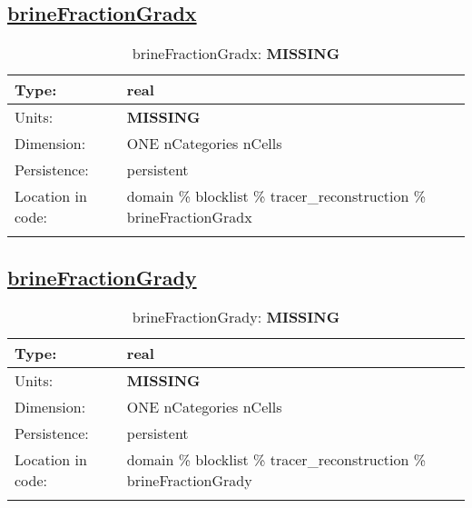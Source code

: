 \subsection[brineFractionGradx]{\hyperref[sec:var_tab_tracer_reconstruction]{brineFractionGradx}}
\label{subsec:var_sec_tracer_reconstruction_brineFractionGradx}
\begin{center}
\begin{longtable}{| p{2.0in} | p{4.0in} |}
        \hline 
        Type: & real \\
        \hline 
        Units: & {\bf \color{red} MISSING} \\
        \hline 
        Dimension: & ONE nCategories nCells \\
        \hline 
        Persistence: & persistent \\
        \hline 
         Location in code: & domain \% blocklist \% tracer\_reconstruction \% brineFractionGradx \\
         \hline 
    \caption{brineFractionGradx: {\bf \color{red} MISSING}}
\end{longtable}
\end{center}
\subsection[brineFractionGrady]{\hyperref[sec:var_tab_tracer_reconstruction]{brineFractionGrady}}
\label{subsec:var_sec_tracer_reconstruction_brineFractionGrady}
\begin{center}
\begin{longtable}{| p{2.0in} | p{4.0in} |}
        \hline 
        Type: & real \\
        \hline 
        Units: & {\bf \color{red} MISSING} \\
        \hline 
        Dimension: & ONE nCategories nCells \\
        \hline 
        Persistence: & persistent \\
        \hline 
         Location in code: & domain \% blocklist \% tracer\_reconstruction \% brineFractionGrady \\
         \hline 
    \caption{brineFractionGrady: {\bf \color{red} MISSING}}
\end{longtable}
\end{center}
